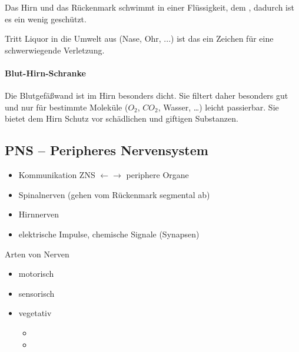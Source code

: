 Das Hirn und das R\"uckenmark schwimmt in einer
Flüssigkeit, dem , dadurch ist es ein wenig
gesch\"utzt. 

Tritt Liquor in die Umwelt aus (Nase, Ohr, ...)  ist das ein Zeichen f\"ur eine schwerwiegende Verletzung. 



\paragraph{Blut-Hirn-Schranke} 

Die Blutgef\"a{\ss}wand ist im Hirn besonders dicht. Sie filtert daher
besonders gut und nur f\"ur bestimmte Molek\"ule ($O_2$,
$CO_2$, Wasser, \ldots) leicht passierbar. Sie bietet dem Hirn
Schutz vor sch\"adlichen und giftigen Substanzen. 


\subsection{PNS -- Peripheres Nervensystem}

\gMarried
{\begin{itemize}
    \item Kommunikation ZNS ${\leftarrow}$${\rightarrow}$ periphere  Organe
    \item Spinalnerven (gehen vom Rückenmark segmental ab)
    \item Hirnnerven %
    \item elektrische Impulse, chemische Signale (Synapsen)
\end{itemize}

Arten von Nerven

\begin{itemize}
    \item motorisch
    \item sensorisch
    \item vegetativ
    \begin{itemize}
        \item {}
        \item {}
    \end{itemize}
\end{itemize}}
{}



